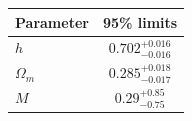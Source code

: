 \begin{tabular} { l  c}

 Parameter &  95\% limits\\
\hline
{\boldmath$h              $} & $0.702^{+0.016}_{-0.016}   $\\

{\boldmath$Ω_m            $} & $0.285^{+0.018}_{-0.017}   $\\

{\boldmath$M              $} & $0.29^{+0.85}_{-0.75}      $\\
\hline
\end{tabular}